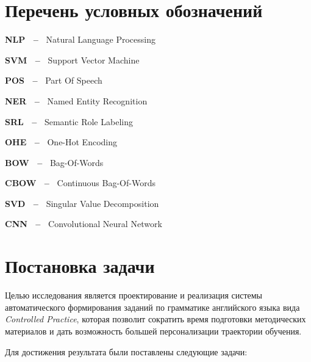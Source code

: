 


\setcounter{secnumdepth}{5}
\setcounter{tocdepth}{5}
\newcommand\simpleparagraph[1]{%
  \stepcounter{paragraph}\paragraph*{\theparagraph\quad{}#1}}
  



\section*{Перечень условных обозначений}
\label{sec:table}

\textbf{NLP ~--~} Natural Language Processing

\textbf{SVM ~--~} Support Vector Machine

\textbf{POS ~--~} Part Of Speech

\textbf{NER ~--~} Named Entity Recognition

\textbf{SRL ~--~} Semantic Role Labeling

\textbf{OHE ~--~} One-Hot Encoding

\textbf{BOW ~--~} Bag-Of-Words

\textbf{CBOW ~--~} Continuous Bag-Of-Words

\textbf{SVD ~--~} Singular Value Decomposition

\textbf{CNN ~--~} Convolutional Neural Network

\newpage
\section*{Постановка задачи}
\label{sec:start}

Целью исследования является проектирование и реализация системы автоматического формирования заданий по грамматике английского языка вида \emph{Controlled Practice}, которая позволит сократить время подготовки методических материалов и дать возможность большей персонализации траектории обучения.

Для достижения результата были поставлены следующие задачи:

